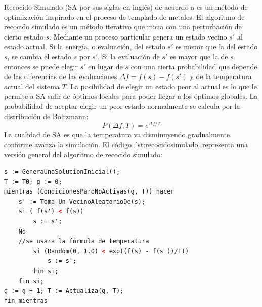 Recocido Simulado (SA por sus siglas en inglés) de acuerdo a \cite{[METROPOLIS]} es un método de optimización inspirado en el proceso de templado de metales. El algoritmo de recocido simulado es un método iterativo que inicia con una perturbación de cierto estado $s$. Mediante un proceso particular genera un estado vecino $s'$ al estado actual. Si la energía, o evaluación, del estado $s'$ es menor que la del estado $s$, se cambia el estado $s$ por $s'$. Si la evaluación de $s'$ es mayor que la de $s$ entonces se puede elegir $s'$ en lugar de $s$ con una cierta probabilidad que depende de las diferencias de las evaluaciones $\Delta f = f(s)-f(s') $ y de la temperatura actual del sistema $T$. La posibilidad de elegir un estado peor al actual es lo que le permite a SA salir de óptimos locales para poder llegar a los óptimos globales. La probabilidad de aceptar elegir un peor estado normalmente se calcula por la distribución de Boltzmann: $$ P(\Delta f, T) = e ^{\Delta f/T} $$
\hspace*{1cm}La cualidad de SA es que la temperatura va disminuyendo gradualmente conforme avanza la simulación. El código \ref{lst:recocidosimulado} representa una versión general del algoritmo de recocido simulado:\\

\begin{lstlisting}[language=HTML, caption=Pseudocódigo base para el algoritmo de recocido simulado., label=lst:recocidosimulado]
s := GeneraUnaSolucionInicial();
T := T0; g := 0;
mientras (CondicionesParoNoActivas(g, T)) hacer
    s' := Toma Un VecinoAleatorioDe(s);
    si ( f(s') < f(s))
        s := s';
    No
    //se usara la fórmula de temperatura
        si (Random(0, 1.0) < exp((f(s) - f(s'))/T)) 
            s := s';
        fin si;
    fin si;
g := g + 1; T := Actualiza(g, T);
fin mientras
\end{lstlisting}



